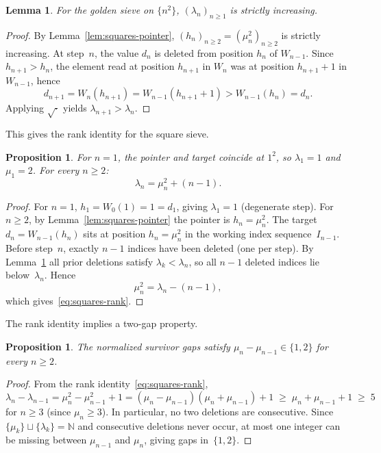 \documentclass[11pt]{article}
\numberwithin{equation}{section}
\theoremstyle{plain}
\newtheorem{lemma}[theorem]{Lemma}
\newtheorem{proposition}[theorem]{Proposition}
\theoremstyle{definition}
\theoremstyle{remark}
\newcommand{\N}{\mathbb{N}}
\begin{document}
\begin{lemma}\label{lem:squares-mono}
For the golden sieve on $\{n^2\}$, $(\lambda_n)_{n\ge1}$ is strictly increasing.
\end{lemma}

\begin{proof}
By Lemma~\ref{lem:squares-pointer}, $(h_n)_{n\ge2}=(\mu_n^2)_{n\ge2}$
is strictly increasing.  At step~$n$, the value $d_n$ is deleted from
position $h_n$ of $W_{n-1}$.  Since $h_{n+1}>h_n$, the element read at
position $h_{n+1}$ in $W_n$ was at position $h_{n+1}+1$ in $W_{n-1}$,
hence
\[
  d_{n+1}=W_n(h_{n+1})=W_{n-1}(h_{n+1}+1)>W_{n-1}(h_n)=d_n.
\]
Applying $\sqrt{\cdot}$ yields $\lambda_{n+1}>\lambda_n$.
\end{proof}

This gives the rank identity for the square sieve.

\begin{proposition}\label{thm:squares-rank}
For $n=1$, the pointer and target coincide at $1^2$, so $\lambda_1=1$ and $\mu_1=2$.
For every $n\ge2$:
\begin{equation}\label{eq:squares-rank}
  \lambda_n = \mu_n^2 + (n-1).
\end{equation}
\end{proposition}

\begin{proof}
For $n=1$, $h_1=W_0(1)=1=d_1$, giving $\lambda_1=1$ (degenerate step).
For $n\ge2$, by Lemma~\ref{lem:squares-pointer} the pointer is
$h_n=\mu_n^2$.  The target $d_n=W_{n-1}(h_n)$ sits at position
$h_n=\mu_n^2$ in the working index sequence~$I_{n-1}$.  Before
step~$n$, exactly $n-1$ indices have been deleted (one per step).
By Lemma~\ref{lem:squares-mono} all prior deletions satisfy
$\lambda_k<\lambda_n$, so all $n-1$ deleted indices lie below~$\lambda_n$.
Hence
\[
  \mu_n^2 = \lambda_n-(n-1),
\]
which gives~\eqref{eq:squares-rank}.
\end{proof}

The rank identity implies a two-gap property.

\begin{proposition}\label{prop:squares-twogap}
The normalized survivor gaps satisfy
$\mu_n-\mu_{n-1}\in\{1,2\}$ for every $n\ge2$.
\end{proposition}

\begin{proof}
From the rank identity~\eqref{eq:squares-rank},
\[
  \lambda_n-\lambda_{n-1}
  = \mu_n^2-\mu_{n-1}^2+1
  = (\mu_n-\mu_{n-1})(\mu_n+\mu_{n-1})+1
  \;\ge\; \mu_n+\mu_{n-1}+1
  \;\ge\; 5
\]
for $n\ge3$ (since $\mu_n\ge 3$).  In particular, no two deletions are
consecutive.  Since $\{\mu_k\}\sqcup\{\lambda_k\}=\N$ and consecutive
deletions never occur, at most one integer can be missing between
$\mu_{n-1}$ and $\mu_n$, giving gaps in~$\{1,2\}$.
\end{proof}
\end{document}
